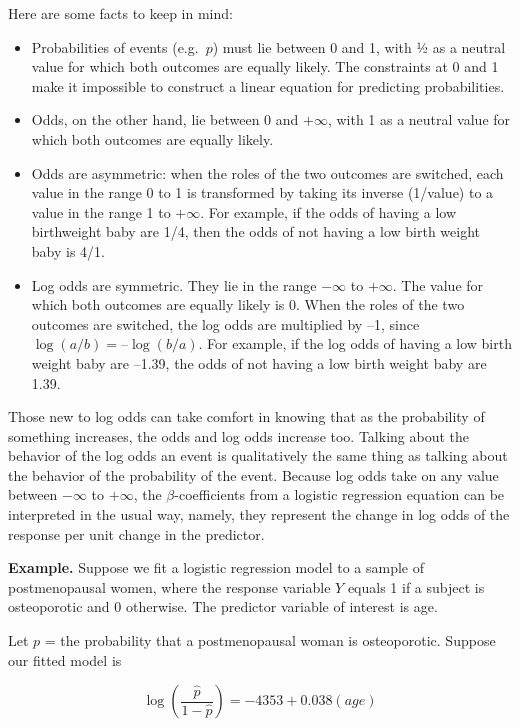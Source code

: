 \documentclass[
]{book}
\providecommand{\tightlist}{%
  \setlength{\itemsep}{0pt}\setlength{\parskip}{0pt}}
\begin{document}
Here are some facts to keep in mind:

\begin{itemize}
\tightlist
\item
  Probabilities of events (e.g.~\(p\)) must lie between 0 and 1, with 1⁄2 as a neutral value for which both outcomes are equally likely. The constraints at 0 and 1 make it impossible to construct a linear equation for predicting probabilities.
\item
  Odds, on the other hand, lie between 0 and \(+\infty\), with 1 as a neutral value for which both outcomes are equally likely.
\item
  Odds are asymmetric: when the roles of the two outcomes are switched, each value in the range 0 to 1 is transformed by taking its inverse (1/value) to a value in the range 1 to \(+\infty\). For example, if the odds of having a low birthweight baby are 1/4, then the odds of not having a low birth weight baby is 4/1.
\item
  Log odds are symmetric. They lie in the range \(-\infty\) to \(+\infty\). The value for which both outcomes are equally likely is 0. When the roles of the two outcomes are switched, the log odds are multiplied by --1, since \(\log(a/b) = –\log(b/a)\). For example, if the log odds of having a low birth weight baby are --1.39, the odds of not having a low birth weight baby are 1.39.
\end{itemize}

Those new to log odds can take comfort in knowing that as the probability of something increases, the odds and log odds increase too. Talking about the behavior of the log odds an event is qualitatively the same thing as talking about the behavior of the probability of the event. Because log odds take on any value between \(-\infty\) to \(+\infty\), the \(\beta\)-coefficients from a logistic regression equation can be interpreted in the usual way, namely, they represent the change in log odds of the response per unit change in the predictor.

\textbf{Example.} Suppose we fit a logistic regression model to a sample of postmenopausal women, where the response variable \(Y\) equals 1 if a subject is osteoporotic and 0 otherwise. The predictor variable of interest is age.

Let \(p\) = the probability that a postmenopausal woman is osteoporotic. Suppose our fitted model is

\[\log\left(\frac{\hat{p}}{1-\hat{p}}\right) = -4353 + 0.038(age)\]
\end{document}
